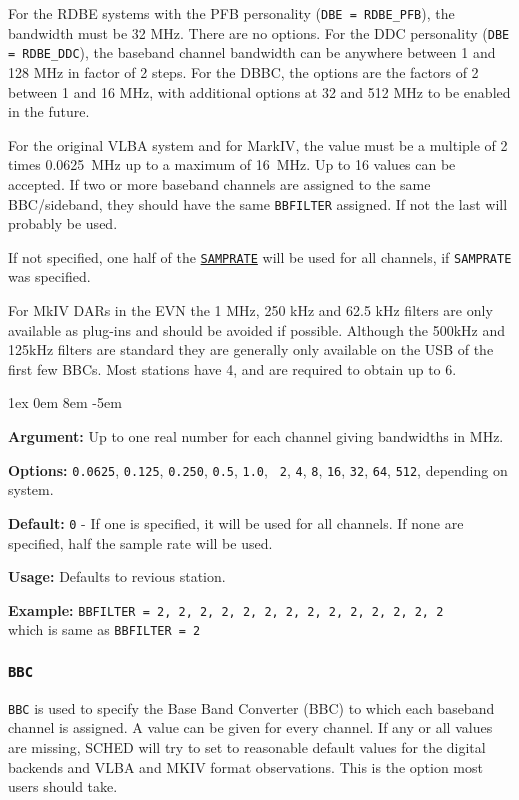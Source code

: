 \documentclass{report}
\newcommand{\rcwbox}[5]{
  \begin{list}{}{\parsep 1ex  \itemsep 0em
                 \leftmargin 8em  \itemindent -5em }
    \item {\bf Argument:} #1
    \item {\bf Options:}  #2
    \item {\bf Default:}  #3
    \item {\bf Usage:}    #4
    \item {\bf Example:}  #5
  \end{list}
}
\begin{document}
For the RDBE systems with the PFB personality ({\tt DBE = RDBE\_PFB}),
the bandwidth must be 32 MHz.  There are no options.  For the DDC
personality ({\tt DBE = RDBE\_DDC}), the baseband channel bandwidth
can be anywhere between 1 and 128 MHz in factor of 2 steps.  For the
DBBC, the options are the factors of 2 between 1 and 16 MHz, with
additional options at 32 and 512 MHz to be enabled in the future.

For the original VLBA system and for MarkIV, the value must be a
multiple of 2 times 0.0625~MHz up to a maximum of 16~MHz. Up to 16
values can be accepted. If two or more baseband channels are assigned
to the same BBC/sideband, they should have the same {\tt BBFILTER}
assigned. If not the last will probably be used.

If not specified, one half of the 
{\hyperref[SP:SAMPRATE]{{\tt SAMPRATE}}}
will be used for all channels, if {\tt SAMPRATE} was specified.

For MkIV DARs in the EVN the 1 MHz, 250 kHz and 62.5 kHz filters
are only available as plug-ins and should be avoided if possible.
Although the 500kHz and 125kHz filters are standard they are generally
only available on the USB of the first few BBCs. Most stations have 4,
and are required to obtain up to 6.

\rcwbox
{Up to one real number for each channel giving bandwidths in MHz.}
{{\tt 0.0625}, {\tt 0.125}, {\tt 0.250}, {\tt 0.5}, {\tt 1.0}, {\tt
2}, {\tt 4}, {\tt 8}, {\tt 16}, {\tt 32}, {\tt 64}, {\tt 512},
depending on system.}
{{\tt 0} - If one is specified, it will be used for all channels.
If none are specified, half the sample rate will be used.}
{Defaults to revious station.}
{{\tt BBFILTER = 2, 2, 2, 2, 2, 2, 2, 2, 2, 2, 2, 2, 2, 2} \\ which
is same as {\tt BBFILTER = 2}}

\subsubsection{\label{SP:BBC}{\tt BBC}}

{\tt BBC} is used to specify the Base Band Converter (BBC) to
which each baseband channel is assigned.  A value can be given
for every channel.  If any or all values are missing, SCHED will
try to set to reasonable default values for the digital backends
and VLBA and MKIV format observations.  This is the option most
users should take.
\end{document}
